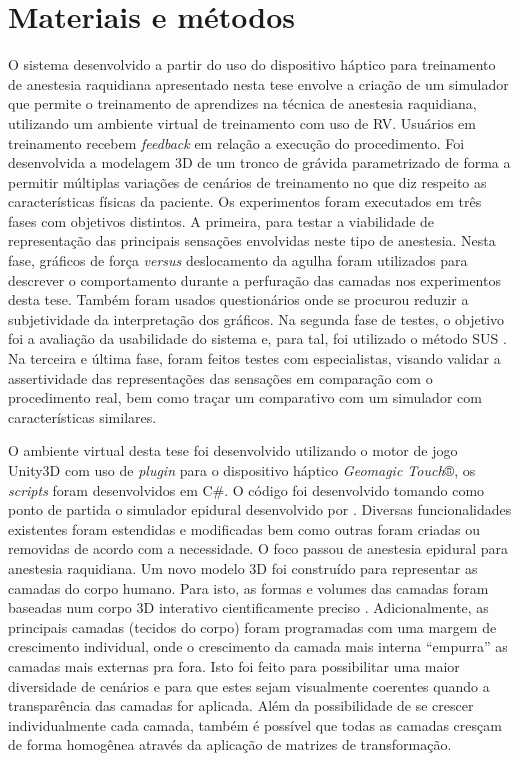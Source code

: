 \chapter{Materiais e métodos} \label{cap:cap4}

O sistema desenvolvido a partir do uso do dispositivo háptico para treinamento de anestesia raquidiana apresentado nesta tese envolve a criação de um simulador que permite o treinamento de aprendizes na técnica de anestesia raquidiana, utilizando um ambiente virtual de treinamento com uso de \acrshort{RV}. Usuários em treinamento recebem \textit{feedback} em relação a execução do procedimento. Foi desenvolvida a modelagem 3D de um tronco de grávida parametrizado de forma a permitir múltiplas variações de cenários de treinamento no que diz respeito as características físicas da paciente. Os experimentos foram executados em três fases com objetivos distintos. A primeira, para testar a viabilidade de representação das principais sensações envolvidas neste tipo de anestesia. Nesta fase, gráficos de força \textit{versus} deslocamento da agulha foram utilizados para descrever o comportamento durante a perfuração das camadas nos experimentos desta tese. Também foram usados questionários onde se procurou reduzir a subjetividade da interpretação dos gráficos. Na segunda fase de testes, o objetivo foi a avaliação da usabilidade do sistema e, para tal, foi utilizado o método SUS \cite{Brooke2013}. Na terceira e última fase, foram feitos testes com especialistas, visando validar a assertividade das representações das sensações em comparação com o procedimento real, bem como traçar um comparativo com um simulador com características similares.

O ambiente virtual desta tese foi desenvolvido utilizando o motor de jogo Unity3D \cite{UnityTechnologies2020} com uso de \textit{plugin} para o dispositivo háptico \textit{Geomagic Touch}®, os \textit{scripts} foram desenvolvidos em C\#. O código foi desenvolvido tomando como ponto de partida o simulador epidural desenvolvido por \textcite{Brazil2017thesis}. Diversas funcionalidades existentes foram estendidas e modificadas bem como outras foram criadas ou removidas de acordo com a necessidade. 
O foco passou de anestesia epidural para anestesia raquidiana. Um novo modelo 3D foi construído para representar as camadas do corpo humano. Para isto, as formas e volumes das camadas foram baseadas num corpo 3D interativo cientificamente preciso \cite{BioDigitalInc2019}. Adicionalmente, as principais camadas (tecidos do corpo) foram programadas com uma margem de crescimento individual, onde o crescimento da camada mais interna ``empurra'' as camadas mais externas pra fora. Isto foi feito para possibilitar uma maior diversidade de cenários e para que estes sejam visualmente coerentes quando a transparência das camadas for aplicada. Além da possibilidade de se crescer individualmente cada camada, também é possível que todas as camadas cresçam de forma homogênea através da aplicação de matrizes de transformação. 

